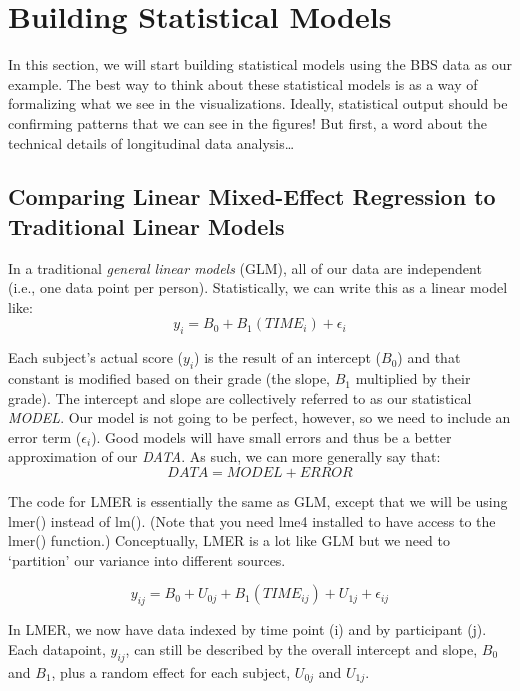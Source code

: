 \documentclass[]{article}
\begin{document}
\newpage

\section{Building Statistical Models}\label{building-statistical-models}

In this section, we will start building statistical models using the BBS
data as our example. The best way to think about these statistical
models is as a way of formalizing what we see in the visualizations.
Ideally, statistical output should be confirming patterns that we can
see in the figures! But first, a word about the technical details of
longitudinal data analysis\ldots{}

\subsection{Comparing Linear Mixed-Effect Regression to Traditional
Linear
Models}\label{comparing-linear-mixed-effect-regression-to-traditional-linear-models}

In a traditional \emph{general linear models} (GLM), all of our data are
independent (i.e., one data point per person). Statistically, we can
write this as a linear model like:
\[y_i = B_0 + B_1 (TIME_i) + \epsilon_i\]

Each subject's actual score (\(y_i\)) is the result of an intercept
(\(B_0\)) and that constant is modified based on their grade (the slope,
\(B_1\) multiplied by their grade). The intercept and slope are
collectively referred to as our statistical \emph{MODEL}. Our model is
not going to be perfect, however, so we need to include an error term
(\(\epsilon_i\)). Good models will have small errors and thus be a
better approximation of our \emph{DATA}. As such, we can more generally
say that: \[DATA = MODEL + ERROR\]

The code for LMER is essentially the same as GLM, except that we will be
using lmer() instead of lm(). (Note that you need lme4 installed to have
access to the lmer() function.) Conceptually, LMER is a lot like GLM but
we need to `partition' our variance into different sources.

\[y_{ij} = B_0 + U_{0j} + B_1(TIME_{ij}) + U_{1j} + \epsilon_{ij}\]

In LMER, we now have data indexed by time point (i) and by participant
(j). Each datapoint, \(y_{ij}\), can still be described by the overall
intercept and slope, \(B_0\) and \(B_1\), plus a random effect for each
subject, \(U_{0j}\) and \(U_{1j}\).
\end{document}
